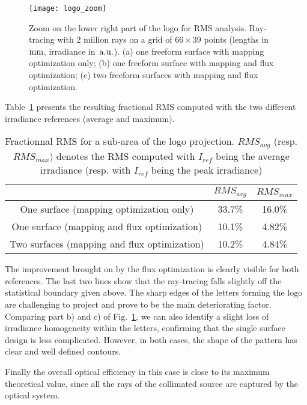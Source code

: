 \begin{figure}[!htbp]
  \centering \texttt{[image: logo\_zoom]}
  \caption{Zoom on the lower right part of the logo for RMS
    analysis. Ray-tracing with 2 million rays on a grid of $66 \times 39$
    points (lengths in~$\rm mm$, irradiance in~$\rm a.u.$). 
    (a) one freeform surface with mapping optimization only; 
    (b) one freeform surface with mapping and flux optimization;
    (c) two freeform surfaces with mapping and flux optimization.}
  \label{fig:logo_zoom}
\end{figure}

Table~\ref{tab:rms} presents the resulting fractional RMS computed
with the two different irradiance references (average and maximum).
\begin{table}[!htbp]
  \centering
  \caption{Fractionnal RMS for a sub-area of the logo
    projection. $RMS_{avg}$ (resp. $RMS_{max})$ denotes the RMS
    computed with $I_{ref}$ being the average irradiance (resp. with
    $I_{ref}$ being the peak irradiance)}
  \label{tab:rms}
  \begin{tabular}{c|c|c|}
    \cline{2-3}
      & $RMS_{avg}$ & $RMS_{max}$ \\ \hline
    \multicolumn{1}{|c|}{One surface (mapping optimization only)} 
      & 33.7\% & 16.0\% \\\hline
    \multicolumn{1}{|c|}{One surface (mapping and flux optimization)}
      & 10.1\% & 4.82\% \\\hline 
    \multicolumn{1}{|c|}{Two surfaces (mapping and flux optimization)}
      & 10.2\% & 4.84\% \\\hline
\end{tabular}
\end{table} 
The improvement brought on by the flux optimization is clearly visible for
both references.  The last two lines show that the ray-tracing falls
slightly off the statistical boundary given above. The sharp edges of
the letters forming the logo are challenging to project and prove to
be the main deteriorating factor.  Comparing part b) and c) of
Fig.~\ref{fig:logo_zoom}, we can also identify a slight loss of
irradiance homogeneity within the letters, confirming that the single
surface design is less complicated.  However, in both cases, the shape
of the pattern has clear and well defined contours.

Finally the overall optical efficiency in this case is close to its
maximum theoretical value, since all the rays of the collimated source
are captured by the optical system.

